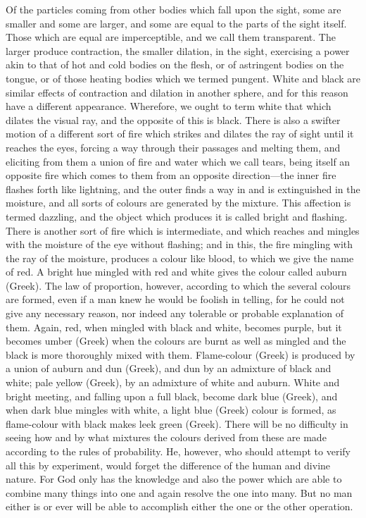 Of the particles coming from other bodies which fall upon the sight, some
are smaller and some are larger, and some are equal to the parts of the
sight itself. Those which are equal are imperceptible, and we call them
transparent. The larger produce contraction, the smaller dilation, in the
sight, exercising a power akin to that of hot and cold bodies on the
flesh, or of astringent bodies on the tongue, or of those heating bodies
which we termed pungent. White and black are similar effects of
contraction and dilation in another sphere, and for this reason have a
different appearance. Wherefore, we ought to term white that which dilates
the visual ray, and the opposite of this is black. There is also a swifter
motion of a different sort of fire which strikes and dilates the ray of
sight until it reaches the eyes, forcing a way through their passages and
melting them, and eliciting from them a union of fire and water which we
call tears, being itself an opposite fire which comes to them from an
opposite direction—the inner fire flashes forth like lightning, and
the outer finds a way in and is extinguished in the moisture, and all
sorts of colours are generated by the mixture. This affection is termed
dazzling, and the object which produces it is called bright and flashing.
There is another sort of fire which is intermediate, and which reaches and
mingles with the moisture of the eye without flashing; and in this, the
fire mingling with the ray of the moisture, produces a colour like blood,
to which we give the name of red. A bright hue mingled with red and white
gives the colour called auburn (Greek). The law of proportion, however,
according to which the several colours are formed, even if a man knew he
would be foolish in telling, for he could not give any necessary reason,
nor indeed any tolerable or probable explanation of them. Again, red, when
mingled with black and white, becomes purple, but it becomes umber (Greek)
when the colours are burnt as well as mingled and the black is more
thoroughly mixed with them. Flame-colour (Greek) is produced by a union of
auburn and dun (Greek), and dun by an admixture of black and white; pale
yellow (Greek), by an admixture of white and auburn. White and bright
meeting, and falling upon a full black, become dark blue (Greek), and when
dark blue mingles with white, a light blue (Greek) colour is formed, as
flame-colour with black makes leek green (Greek). There will be no
difficulty in seeing how and by what mixtures the colours derived from
these are made according to the rules of probability. He, however, who
should attempt to verify all this by experiment, would forget the
difference of the human and divine nature. For God only has the knowledge
and also the power which are able to combine many things into one and
again resolve the one into many. But no man either is or ever will be able
to accomplish either the one or the other operation.


